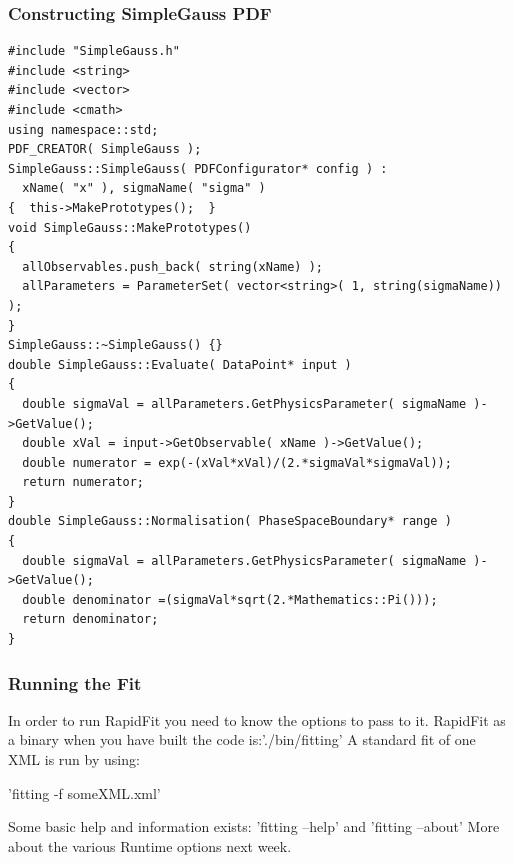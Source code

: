 \documentclass{beamer}
\begin{document}
\begin{frame}[fragile]
\frametitle{Constructing SimpleGauss PDF}
\tiny
\begin{lstlisting}[tabsize=8]
#include "SimpleGauss.h"
#include <string>
#include <vector>
#include <cmath>
using namespace::std;
PDF_CREATOR( SimpleGauss );
SimpleGauss::SimpleGauss( PDFConfigurator* config ) :
  xName( "x" ), sigmaName( "sigma" )
{  this->MakePrototypes();  }
void SimpleGauss::MakePrototypes()
{
  allObservables.push_back( string(xName) );
  allParameters = ParameterSet( vector<string>( 1, string(sigmaName)) );
}
SimpleGauss::~SimpleGauss() {}
double SimpleGauss::Evaluate( DataPoint* input )
{
  double sigmaVal = allParameters.GetPhysicsParameter( sigmaName )->GetValue();
  double xVal = input->GetObservable( xName )->GetValue();
  double numerator = exp(-(xVal*xVal)/(2.*sigmaVal*sigmaVal));
  return numerator;
}
double SimpleGauss::Normalisation( PhaseSpaceBoundary* range )
{
  double sigmaVal = allParameters.GetPhysicsParameter( sigmaName )->GetValue();
  double denominator =(sigmaVal*sqrt(2.*Mathematics::Pi()));
  return denominator;
}
\end{lstlisting}

\end{frame}

\begin{frame}
 \frametitle{Running the Fit}
 In order to run RapidFit you need to know the options to pass to it.\newline\newline
 RapidFit as a binary when you have built the code is:\newline './bin/fitting'\newline\newline
 A standard fit of one XML is run by using:\newline
 \begin{center}
 'fitting -f someXML.xml'\newline
 \end{center}

 Some basic help and information exists:\newline
 'fitting --help' and 'fitting --about'\newline\newline
 More about the various Runtime options next week.
\end{frame}
\end{document}
